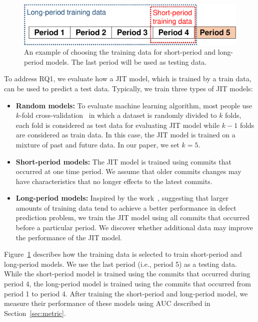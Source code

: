 \begin{figure}
	\center
	\includegraphics[scale=0.36]{figs/split.pdf}
	\caption{An example of choosing the training data for short-period and long-period models. The last period will be used as testing data.}
	\label{fig:splitting}
\end{figure}

To address RQ1, we evaluate how a JIT model, which is trained by a train data, can be used to predict a test data. Typically, we train three types of JIT models: 
\begin{itemize}
\item \textbf{Random models:} To evaluate machine learning algorithm, most people use $k$-fold cross-validation~\cite{kohavi1995study} in which a dataset is randomly divided to $k$ folds, each fold is considered as test data for evaluating JIT model while $k - 1$ folds are considered as train data. In this case, the JIT model is trained on a mixture of past and future data. In our paper, we set $k = 5$.
\item \textbf{Short-period models:} The JIT model is trained using commits that occurred at one time period. We assume that older commits changes may have characteristics that no longer effects to the latest commits. 
\item \textbf{Long-period models:} Inspired by the work~\cite{rahman2013sample}, suggesting that larger amounts of training data tend to achieve a better performance in defect prediction problem, we train the JIT model using all commits that occurred before a particular period. We discover whether additional data may improve the performance of the JIT model. 
\end{itemize} 

Figure~\ref{fig:splitting} describes how the training data is selected to train short-period and long-period models. We use the last period (i.e., period 5) as a testing data. While the short-period model is trained using the commits that occurred during period 4, the long-period model is trained using the commits that occurred from period 1 to period 4. After training the short-period and long-period model, we measure their performance of these models using AUC described in Section~\ref{sec:metric}.

